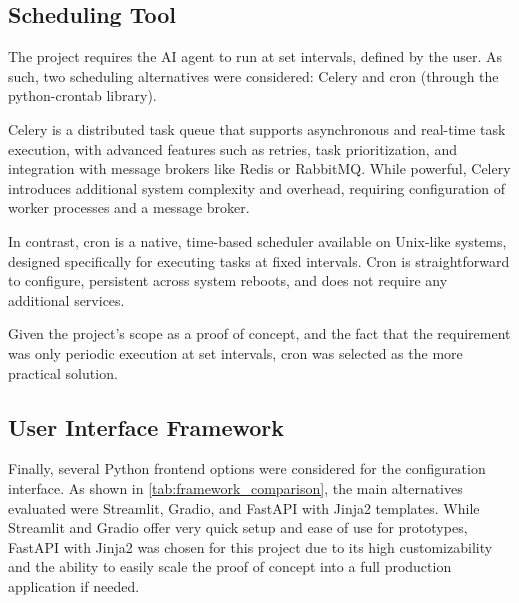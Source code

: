 \documentclass[a4paper]{report}
\begin{document}
\subsection{Scheduling Tool}

The project requires the AI agent to run at set intervals, defined by the user. As such, two scheduling alternatives were considered: Celery and cron (through the python-crontab library).

Celery is a distributed task queue that supports asynchronous and real-time task execution, with advanced features such as retries, task prioritization, and integration with message brokers like Redis or RabbitMQ. While powerful, Celery introduces additional system complexity and overhead, requiring configuration of worker processes and a message broker.

In contrast, cron is a native, time-based scheduler available on Unix-like systems, designed specifically for executing tasks at fixed intervals. Cron is straightforward to configure, persistent across system reboots, and does not require any additional services.

Given the project's scope as a proof of concept, and the fact that the requirement was only periodic execution at set intervals, cron was selected as the more practical solution.

\subsection{User Interface Framework}

Finally, several Python frontend options were considered for the configuration interface. As shown in \autoref{tab:framework_comparison}, the main alternatives evaluated were Streamlit, Gradio, and FastAPI with Jinja2 templates. While Streamlit and Gradio offer very quick setup and ease of use for prototypes, FastAPI with Jinja2 was chosen for this project due to its high customizability and the ability to easily scale the proof of concept into a full production application if needed.
\end{document}
